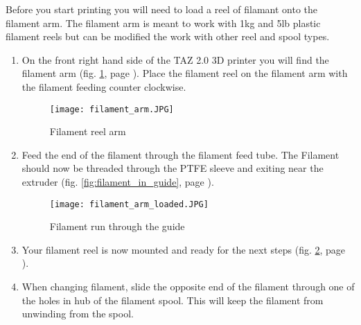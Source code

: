 
Before you start printing you will need to load a reel of filamant onto the filament arm. The filament arm is meant to work with 1kg and 5lb plastic filament reels but can be modified the work with other reel and spool types. 

\begin{enumerate}

\item On the front right hand side of the TAZ 2.0 3D printer you will find the filament arm (fig. \ref{fig:filament_arm}, page \pageref{fig:filament_arm}). Place the filament reel on the filament arm with the filament feeding counter clockwise.

\begin{figure}[H]
\centering
\texttt{[image: filament\_arm.JPG]}
\caption{Filament reel arm}
\label{fig:filament_arm}
\end{figure}

\item Feed the end of the filament through the filament feed tube. The Filament should now be threaded through the PTFE sleeve and exiting near the extruder (fig. \ref{fig:filament_in_guide}, page \pageref{fig:filament_in_guide}).

\begin{figure}[H]
\centering
\texttt{[image: filament\_arm\_loaded.JPG]}
\caption{Filament run through the guide}
\label{fig:filament_arm_loaded}
\end{figure}

\item Your filament reel is now mounted and ready for the next steps (fig. \ref{fig:filament_arm_loaded}, page \pageref{fig:filament_arm_loaded}).


\item When changing filament, slide the opposite end of the filament through one of the holes in hub of the filament spool. This will keep the filament from unwinding from the spool.



\end{enumerate}

